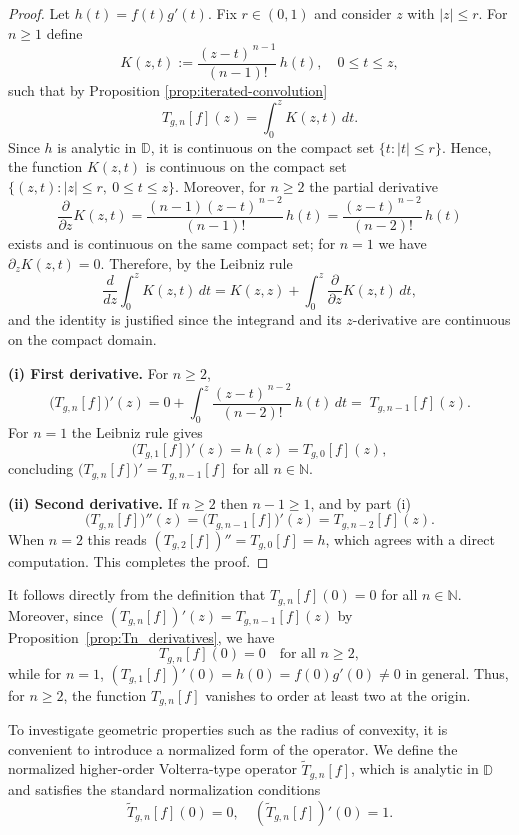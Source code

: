 \documentclass[12pt,a4paper]{amsart}
\numberwithin{equation}{section}
\theoremstyle{remark}
\newcommand{\D}{\mathbb{D}}
\begin{document}
\begin{proof}
Let \(h(t)=f(t)g'(t)\). Fix \(r\in(0,1)\) and consider \(z\) with \(|z|\le r\). For \(n\ge1\) define
\[
K(z,t):=\frac{(z-t)^{\,n-1}}{(n-1)!}\,h(t),\quad 0\le t\le z,
\]
such that by Proposition \ref{prop:iterated-convolution}
\[
T_{g,n}[f](z)=\int_0^z K(z,t)\,dt.
\]
Since \(h\) is analytic in \(\D\), it is continuous on the compact set
\(\{t: |t|\le r\}\). Hence, the function
\(K(z,t)\) is continuous on the compact set
\(\{(z,t): |z|\le r,\ 0\le t\le z\}\). Moreover, for \(n\ge2\) the partial derivative
\[
\frac{\partial}{\partial z}K(z,t)=\frac{(n-1)(z-t)^{\,n-2}}{(n-1)!}\,h(t)
=\frac{(z-t)^{\,n-2}}{(n-2)!}\,h(t)
\]
exists and is continuous on the same compact set; for \(n=1\) we have \(\partial_z K(z,t)=0\).
Therefore, by the Leibniz rule 
\[
\frac{d}{dz}\int_0^z K(z,t)\,dt
=K(z,z)+\int_0^z \frac{\partial}{\partial z}K(z,t)\,dt,
\]
and the identity is justified since the integrand and its \(z\)-derivative are continuous on the compact domain.

\medskip
\noindent\textbf{(i) First derivative.} For \(n\ge2\),
\[
\bigl(T_{g,n}[f]\bigr)'(z)
=0+\int_0^z \frac{(z-t)^{\,n-2}}{(n-2)!}\,h(t)\,dt
=\;T_{g,n-1}[f](z).
\]
For \(n=1\) the Leibniz rule gives
\[
\bigl(T_{g,1}[f]\bigr)'(z)=h(z)=T_{g,0}[f](z),
\]
concluding \(\bigl(T_{g,n}[f]\bigr)'=T_{g,n-1}[f]\) for all $n\in\mathbb N$.

\medskip
\noindent\textbf{(ii) Second derivative.} If \(n\ge2\) then \(n-1\ge1\), and by part (i)
\[
\bigl(T_{g,n}[f]\bigr)''(z)
=\bigl(T_{g,n-1}[f]\bigr)'(z)
= T_{g,n-2}[f](z).
\]
When \(n=2\) this reads \((T_{g,2}[f])''=T_{g,0}[f]=h\), which agrees with a direct computation.
This completes the proof.
\end{proof}


It follows directly from the definition that \(T_{g,n}[f](0)=0\) for all \(n\in\mathbb{N}\). 
Moreover, since \((T_{g,n}[f])'(z)=T_{g,n-1}[f](z)\) by Proposition~\ref{prop:Tn_derivatives}, we have 
\[
T_{g,n}[f](0) =0 \quad \text{for all } n\ge2,
\]
while for \(n=1\), \((T_{g,1}[f])'(0)=h(0)=f(0)g'(0)\neq0\) in general. 
Thus, for \(n\ge2\), the function \(T_{g,n}[f]\) vanishes to order at least two at the origin.

\medskip
To investigate geometric properties such as the radius of convexity, 
it is convenient to introduce a normalized form of the operator. 
We define the normalized higher-order Volterra-type operator
\(\widetilde{T}_{g,n}[f]\), which is analytic in \(\mathbb{D}\) and satisfies the standard normalization conditions
\[
\widetilde{T}_{g,n}[f](0) =0,\quad (\widetilde{T}_{g,n}[f])'(0)=1.
\]
\end{document}
